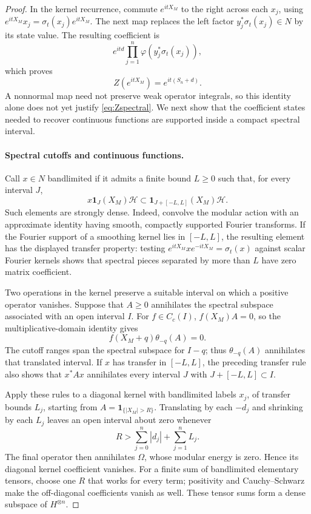 \documentclass[11pt]{article}
\theoremstyle{definition}
\newcommand{\HH}{\mathcal H}
\newcommand{\one}{\mathbf1}
\begin{document}
\begin{proof}
In the kernel recurrence, commute $e^{itX_M}$ to the right across each
$x_j$, using $e^{itX_M}x_j=\sigma_t(x_j)e^{itX_M}$. The next map replaces
the left factor $y_j^*\sigma_t(x_j)\in N$ by its state value. The resulting
coefficient is
\[
 e^{itd}\prod_{j=1}^n\varphi(y_j^*\sigma_t(x_j)),
\]
which proves
\begin{equation}\label{eq:Zgroups}
 Z(e^{itX_M})=e^{it(S_n+d)}.
\end{equation}
A nonnormal map need not preserve weak operator integrals, so this identity
alone does not yet justify \eqref{eq:Zspectral}. We next show that the
coefficient states needed to recover continuous functions are supported
inside a compact spectral interval.

\paragraph{Spectral cutoffs and continuous functions.}
Call $x\in N$ bandlimited if it admits a finite bound $L\ge0$ such that,
for every interval $J$,
\[
 x\one_J(X_M)\HH
 \subset\one_{J+[-L,L]}(X_M)\HH.
\]
Such elements are strongly dense. Indeed, convolve the modular action with
an approximate identity having smooth, compactly supported Fourier
transforms. If the Fourier support of a smoothing kernel lies in $[-L,L]$,
the resulting element has the displayed transfer property: testing
$e^{itX_M}xe^{-itX_M}=\sigma_t(x)$ against scalar Fourier kernels shows
that spectral pieces separated by more than $L$ have zero matrix
coefficient.

Two operations in the kernel preserve a suitable interval on which a
positive operator vanishes. Suppose that $A\ge0$ annihilates the spectral
subspace associated with an open interval $I$. For $f\in C_c(I)$,
$f(X_M)A=0$, so the multiplicative-domain identity gives
\[
 f(X_M+q)\theta_{-q}(A)=0.
\]
The cutoff ranges span the spectral subspace for $I-q$; thus
$\theta_{-q}(A)$ annihilates that translated interval. If $x$ has transfer
in $[-L,L]$, the preceding transfer rule also shows that $x^*Ax$
annihilates every interval $J$ with $J+[-L,L]\subset I$.

Apply these rules to a diagonal kernel with bandlimited labels $x_j$, of
transfer bounds $L_j$, starting from $A=\one_{\{|X_M|>R\}}$. Translating
by each $-d_j$ and shrinking by each $L_j$ leaves an open interval about
zero whenever
\[
 R>\sum_{j=0}^n|d_j|+\sum_{j=1}^nL_j.
\]
The final operator then annihilates $\Omega$, whose modular energy is zero.
Hence its diagonal kernel coefficient vanishes. For a finite sum of
bandlimited elementary tensors, choose one $R$ that works for every term;
positivity and Cauchy--Schwarz make the off-diagonal coefficients vanish
as well. These tensor sums form a dense subspace of $H^{\otimes n}$.


\end{proof}
\end{document}
